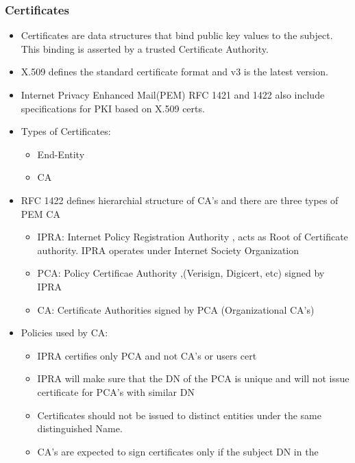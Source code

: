 \documentclass[a4paper]{article}
\begin{document}
    \subsubsection {Certificates}
        \begin{itemize}
            \item Certificates are data structures that bind public key values to the subject. This binding is asserted by a trusted Certificate Authority.
            \item X.509 defines the standard certificate format and v3 is the latest version.
            \item Internet Privacy Enhanced Mail(PEM) RFC 1421 and 1422 also include specifications for PKI based on X.509 certs. 
            \item Types of Certificates:
                \begin{itemize}
                    \item End-Entity
                    \item CA
                \end{itemize}
            \item RFC 1422 defines hierarchial structure  of CA's and there are three types of PEM CA
                \begin{itemize}
                    \item IPRA: Internet Policy Registration Authority , acts as Root of Certificate authority. IPRA operates under Internet Society Organization
                    \item PCA: Policy Certificae Authority ,(Verisign, Digicert, etc) signed by IPRA
                    \item CA: Certificate Authorities signed by PCA (Organizational CA's)
                \end{itemize}
            \item Policies used by CA:
                \begin{itemize}
                    \item IPRA certifies only PCA and not CA's or users cert
                    \item IPRA will make sure that the DN of the PCA is unique and will not issue certificate for PCA's with similar DN
                    \item Certificates should not be issued to distinct entities under the same distinguished Name. 
                    \item CA's are expected to sign certificates only if the subject DN in the

\end{itemize}
\end{itemize}
\end{document}
